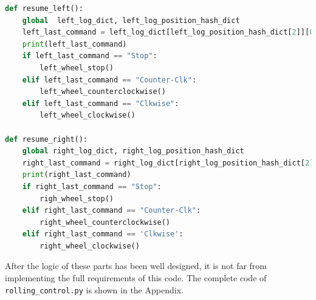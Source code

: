 \documentclass[12pt]{report}
\newcommand{\code}[1]{\colorbox{light-gray}{\texttt{#1}}}
\begin{document}
\begin{center}
\begin{lstlisting}[language=Python, label=code:code7, caption= Example implementation of GPIO 22 pin] 
def resume_left():
    global  left_log_dict, left_log_position_hash_dict
    left_last_command = left_log_dict[left_log_position_hash_dict[2]][0]
    print(left_last_command)
    if left_last_command == "Stop":
        left_wheel_stop()
    elif left_last_command == "Counter-Clk":
        left_wheel_counterclockwise()
    elif left_last_command == "Clkwise":
        left_wheel_clockwise()

def resume_right():
    global right_log_dict, right_log_position_hash_dict
    right_last_command = right_log_dict[right_log_position_hash_dict[2]][0]
    print(right_last_command)
    if right_last_command == "Stop":
        righ_wheel_stop()
    elif right_last_command == "Counter-Clk":
        right_wheel_counterclockwise()
    elif right_last_command == 'Clkwise':
        right_wheel_clockwise()
\end{lstlisting}
\end{center}\vspace{-2em}
After the logic of these parts has been well designed, it is not far from implementing the full requirements of this code. The complete code of \code{rolling\_control.py} is shown in the Appendix.
\end{document}
